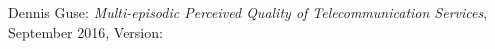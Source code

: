 \thispagestyle{empty}

\hfill

\vfill

\noindent{}Dennis Guse: \textit{Multi-episodic Perceived Quality of Telecommunication Services}, %
\textcopyright{} September 2016, Version: \textsc{\myVersion}


%
%
%
%
%
